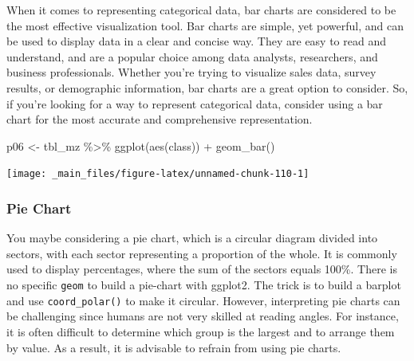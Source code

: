 \documentclass[
]{book}
\newenvironment{Shaded}{\begin{snugshade}}{\end{snugshade}}
\newcommand{\FunctionTok}[1]{\textcolor[rgb]{0.00,0.00,0.00}{#1}}
\newcommand{\NormalTok}[1]{#1}
\newcommand{\OtherTok}[1]{\textcolor[rgb]{0.56,0.35,0.01}{#1}}
\newcommand{\SpecialCharTok}[1]{\textcolor[rgb]{0.00,0.00,0.00}{#1}}
\begin{document}
When it comes to representing categorical data, bar charts are considered to be the most effective visualization tool. Bar charts are simple, yet powerful, and can be used to display data in a clear and concise way. They are easy to read and understand, and are a popular choice among data analysts, researchers, and business professionals. Whether you're trying to visualize sales data, survey results, or demographic information, bar charts are a great option to consider. So, if you're looking for a way to represent categorical data, consider using a bar chart for the most accurate and comprehensive representation.

\begin{Shaded}
\begin{Highlighting}[]
\NormalTok{p06 }\OtherTok{\textless{}{-}}\NormalTok{ tbl\_mz }\SpecialCharTok{\%\textgreater{}\%} 
  \FunctionTok{ggplot}\NormalTok{(}\FunctionTok{aes}\NormalTok{(class)) }\SpecialCharTok{+} 
  \FunctionTok{geom\_bar}\NormalTok{()}
\end{Highlighting}
\end{Shaded}

\begin{center}\texttt{[image: \_main\_files/figure-latex/unnamed-chunk-110-1]} \end{center}

\hypertarget{pie-chart}{%
\subsubsection*{Pie Chart}\label{pie-chart}}

You maybe considering a pie chart, which is a circular diagram divided into sectors, with each sector representing a proportion of the whole. It is commonly used to display percentages, where the sum of the sectors equals 100\%. There is no specific \texttt{geom} to build a pie-chart with ggplot2. The trick is to build a barplot and use \texttt{coord\_polar()} to make it circular. However, interpreting pie charts can be challenging since humans are not very skilled at reading angles. For instance, it is often difficult to determine which group is the largest and to arrange them by value. As a result, it is advisable to refrain from using pie charts.
\end{document}
